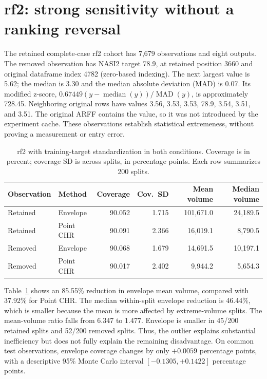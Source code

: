 \documentclass[11pt,letterpaper]{article}
\begin{document}
\section{rf2: strong sensitivity without a ranking reversal}
The retained complete-case rf2 cohort has 7,679 observations and eight outputs.
The removed observation has NASI2 target 78.9, at retained position 3660 and
original dataframe index 4782 (zero-based indexing). The next largest value is
5.62; the median is 3.30 and the median absolute deviation (MAD) is 0.07.
Its modified z-score, $0.67449(y-\operatorname{median}(y))/\operatorname{MAD}(y)$,
is approximately 728.45. Neighboring original rows have values
3.56, 3.53, 3.53, 78.9, 3.54, 3.51, and 3.51. The original ARFF contains the
value, so it was not introduced by the experiment cache. These observations
establish statistical extremeness, without proving a measurement or entry error.

\begin{table}[htbp]
\centering\small
\caption{rf2 with training-target standardization in both conditions.
Coverage is in percent; coverage SD is across splits, in percentage points.
Each row summarizes 200 splits.}
\label{tab:rf2}
\begin{tabular}{llrrrr}
\toprule
Observation & Method & Coverage & Cov.\ SD & Mean volume & Median volume\\
\midrule
Retained & Envelope & 90.052 & 1.715 & 101,671.0 & 24,189.5 \\
Retained & Point CHR & 90.091 & 2.366 & 16,019.1 & 8,790.5 \\
\addlinespace
Removed & Envelope & 90.068 & 1.679 & 14,691.5 & 10,197.1 \\
Removed & Point CHR & 90.017 & 2.402 & 9,944.2 & 5,654.3 \\
\bottomrule
\end{tabular}
\end{table}

Table~\ref{tab:rf2} shows an 85.55\% reduction in envelope mean volume, compared
with 37.92\% for Point CHR. The median within-split envelope reduction is
46.44\%, which is smaller because the mean is more affected by extreme-volume
splits. The mean-volume ratio falls from 6.347 to 1.477. Envelope is smaller
in 45/200 retained splits and 52/200 removed splits. Thus, the outlier explains
substantial inefficiency but does not fully explain the remaining disadvantage.
On common test observations, envelope coverage changes by only $+0.0059$
percentage points, with a descriptive 95\% Monte Carlo interval
$[-0.1305,+0.1422]$ percentage points.
\end{document}
